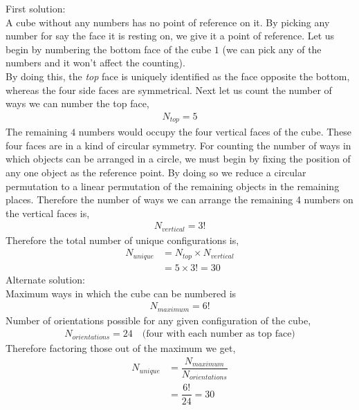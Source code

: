 \begin{solution}[\halfpage]
  First solution: \\
  A cube without any numbers has no point of reference on it. By picking
  any number for say the face it is resting on, we give it a point of
  reference. Let us begin by numbering the bottom face of the cube $1$ 
  (we can pick any of the numbers and it won't affect the counting). \\
  By doing this, the \textit{top} face is uniquely identified as the face
  opposite the bottom, whereas the four side faces are symmetrical.
  Next let us count the number of ways we can number the top face,
  \begin{align}
     N_{top} = 5 \nonumber
  \end{align}
  The remaining $4$ numbers would occupy the four vertical faces of the cube.
  These four faces are in a kind of circular symmetry. For counting the number
  of ways in which objects can be arranged in a circle, we must begin by 
  fixing the position of any one object as the reference point.
  By doing so we reduce a circular permutation to a linear permutation of the
  remaining objects in the remaining places. Therefore the number of ways we
  can arrange the remaining 4 numbers on the vertical faces is,
  \begin{align}
     N_{vertical} = 3! \nonumber
  \end{align}
  Therefore the total number of unique configurations is,
  \begin{align}
    N_{unique} &= N_{top} \times N_{vertical} \nonumber \\
               &= 5 \times 3! = 30 \nonumber 
  \end{align}
  Alternate solution:\\
  Maximum ways in which the cube can be numbered is 
  \begin{align}
    N_{maximum} = 6! \nonumber
  \end{align}
  Number of orientations possible for any given configuration of the cube,
  \begin{align}
    N_{orientations} = 24 \quad\text{(four with each number as top face)} \nonumber
  \end{align}
  Therefore factoring those out of the maximum we get,
  \begin{align}
    N_{unique} &= \dfrac{N_{maximum}}{N_{orientations}} \nonumber \\
               &= \dfrac{6!}{24} = 30 \nonumber
  \end{align}   
\end{solution}

